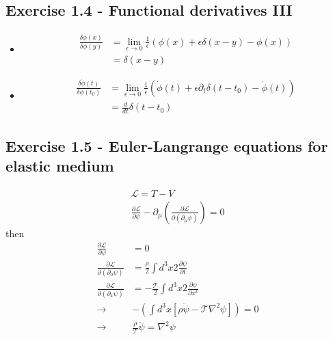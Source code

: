 \documentclass[../main.tex]{subfiles}
\begin{document}
\subsection*{Exercise 1.4 - Functional derivatives III}
\begin{itemize}
\item
\begin{align}
\frac{\delta\phi(x)}{\delta\phi(y)}
&=\lim_{\epsilon\rightarrow0}\frac{1}{\epsilon}\left(\phi(x)+\epsilon\delta(x-y)-\phi(x)\right)\\
&=\delta(x-y)
\end{align}
\item
\begin{align}
\frac{\delta\dot\phi(t)}{\delta\phi(t_0)}
&=\lim_{\epsilon\rightarrow0}\frac{1}{\epsilon}\left(\dot\phi(t)+\epsilon\partial_t\delta(t-t_0)-\dot\phi(t)\right)\\
&=\frac{d}{dt}\delta(t-t_0)
\end{align}
\end{itemize}

\subsection*{Exercise 1.5 - Euler-Langrange equations for elastic medium}
\begin{align}
\mathcal{L}=T-V\\
\frac{\partial\mathcal{L}}{\partial\psi}-\partial_\mu\left(\frac{\partial\mathcal{L}}{\partial(\partial_\mu\psi)}\right)=0
\end{align}
then
\begin{align}
\frac{\partial\mathcal{L}}{\partial\psi}&=0\\
\frac{\partial\mathcal{L}}{\partial(\partial_0\psi)}&=\frac{\rho}{2}\int d^3x 2\frac{\partial\psi}{\partial t}\\
\frac{\partial\mathcal{L}}{\partial(\partial_k\psi)}&=-\frac{\mathcal{T}}{2}\int d^3x 2\frac{\partial\psi}{\partial x^k}\\
\rightarrow&-\left(\int d^3x[\rho\ddot\psi-\mathcal{T}\nabla^2\psi]\right)=0\\
\rightarrow&\frac{\rho}{\mathcal{T}}\ddot\psi=\nabla^2\psi
\end{align}
\end{document}
